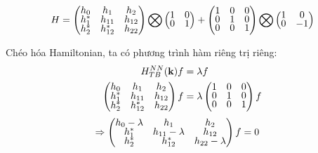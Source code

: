 \documentclass{article}
\begin{document}
\begin{align}
	H =
	\begin{pmatrix}
		\renewcommand{\arraystretch}{0.72}
		h_0   & h_1      & h_2    \\
		h_1^* & h_{11}   & h_{12} \\
		h_2^* & h_{12}^* & h_{22}
	\end{pmatrix}
	\bigotimes
	\begin{pmatrix}
		\renewcommand{\arraystretch}{0.72}
		1 & 0 \\
		0 & 1
	\end{pmatrix}
	+
	\begin{pmatrix}
		\renewcommand{\arraystretch}{0.72}
		1 & 0 & 0 \\
		0 & 1 & 0 \\
		0 & 0 & 1 
	\end{pmatrix}
	\bigotimes
	\begin{pmatrix}
		1 & 0  \\
		0 & -1
	\end{pmatrix}
\end{align}














\clearpage

Chéo hóa Hamiltonian, ta có phương trình hàm riêng trị riêng:
\begin{align*}
	H_{TB}^{NN}(\mathbf{k}) f & = \lambda f \\
	\begin{pmatrix}
		\renewcommand{\arraystretch}{0.72}
		h_0   & h_1      & h_2    \\
		h_1^* & h_{11}   & h_{12} \\
		h_2^* & h_{12}^* & h_{22}
	\end{pmatrix}f
	                          & = \lambda
	\begin{pmatrix}
		\renewcommand{\arraystretch}{0.72}
		1 & 0 & 0 \\
		0 & 1 & 0 \\
		0 & 0 & 1 \\
	\end{pmatrix}f
\end{align*}
\begin{align*}
	\Rightarrow
	\begin{pmatrix}
		\renewcommand{\arraystretch}{0.72}
		h_0 - \lambda & h_1              & h_2              \\
		h_1^*         & h_{11} - \lambda & h_{12}           \\
		h_2^*         & h_{12}^*         & h_{22} - \lambda
	\end{pmatrix}f
	 & = 0
\end{align*}
\end{document}
